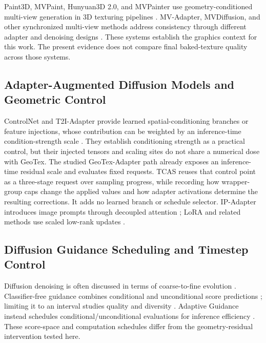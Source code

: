 \documentclass[times,twocolumn,final]{elsarticle}
\begin{document}
Paint3D, MVPaint, Hunyuan3D 2.0, and MVPainter use geometry-conditioned multi-view generation in 3D texturing pipelines \cite{zeng2024paint3d,cheng2024mvpaint,lai2025hunyuan3d,shao2025mvpainter}. MV-Adapter, MVDiffusion, and other synchronized multi-view methods address consistency through different adapter and denoising designs \cite{huang2024mvadapter,tang2023mvdiffusion,liu2024synchronized,xu2026wondertex}. These systems establish the graphics context for this work. The present evidence does not compare final baked-texture quality across those systems.

\subsection{Adapter-Augmented Diffusion Models and Geometric Control}
\label{subsec:adapter}

ControlNet and T2I-Adapter provide learned spatial-conditioning branches or feature injections, whose contribution can be weighted by an inference-time condition-strength scale \cite{mou2023t2iadapter,zhang2023controlnet}. They establish conditioning strength as a practical control, but their injected tensors and scaling sites do not share a numerical dose with GeoTex. The studied GeoTex-Adapter path already exposes an inference-time residual scale and evaluates fixed requests. TCAS reuses that control point as a three-stage request over sampling progress, while recording how wrapper-group caps change the applied values and how adapter activations determine the resulting corrections. It adds no learned branch or schedule selector. IP-Adapter introduces image prompts through decoupled attention \cite{ye2023ipadapter}; LoRA and related methods use scaled low-rank updates \cite{hu2022lora,liu2024dora,zhang2023adalora}.

\subsection{Diffusion Guidance Scheduling and Timestep Control}
\label{subsec:guidance}

Diffusion denoising is often discussed in terms of coarse-to-fine evolution \cite{ho2020ddpm,song2021ddim}. Classifier-free guidance combines conditional and unconditional score predictions \cite{ho2022cfg}; limiting it to an interval studies quality and diversity \cite{kynkanniemi2024limited}. Adaptive Guidance instead schedules conditional/unconditional evaluations for inference efficiency \cite{castillo2023adaptive}. These score-space and computation schedules differ from the geometry-residual intervention tested here.
\end{document}
